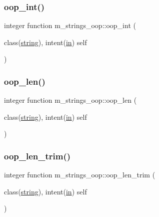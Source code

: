 \mbox{\label{namespacem__strings__oop_a2092266bec4014f74b8d436c5a8e319f}} 
\subsubsection{\texorpdfstring{oop\+\_\+int()}{oop\_int()}}
{\footnotesize\ttfamily integer function m\+\_\+strings\+\_\+oop\+::oop\+\_\+int (\begin{DoxyParamCaption}\item[{class(\hyperlink{structm__strings__oop_1_1string}{string}), intent(\hyperlink{M__journal_83_8txt_afce72651d1eed785a2132bee863b2f38}{in})}]{self }\end{DoxyParamCaption})\hspace{0.3cm}{\ttfamily [private]}}

\mbox{\label{namespacem__strings__oop_a768ea13372aadbeae760c72d0b2a1939}} 
\subsubsection{\texorpdfstring{oop\+\_\+len()}{oop\_len()}}
{\footnotesize\ttfamily integer function m\+\_\+strings\+\_\+oop\+::oop\+\_\+len (\begin{DoxyParamCaption}\item[{class(\hyperlink{structm__strings__oop_1_1string}{string}), intent(\hyperlink{M__journal_83_8txt_afce72651d1eed785a2132bee863b2f38}{in})}]{self }\end{DoxyParamCaption})\hspace{0.3cm}{\ttfamily [private]}}

\mbox{\label{namespacem__strings__oop_a1b9bf3c6aac71ce1782fb3116ffb63f8}} 
\subsubsection{\texorpdfstring{oop\+\_\+len\+\_\+trim()}{oop\_len\_trim()}}
{\footnotesize\ttfamily integer function m\+\_\+strings\+\_\+oop\+::oop\+\_\+len\+\_\+trim (\begin{DoxyParamCaption}\item[{class(\hyperlink{structm__strings__oop_1_1string}{string}), intent(\hyperlink{M__journal_83_8txt_afce72651d1eed785a2132bee863b2f38}{in})}]{self }\end{DoxyParamCaption})\hspace{0.3cm}{\ttfamily [private]}}

